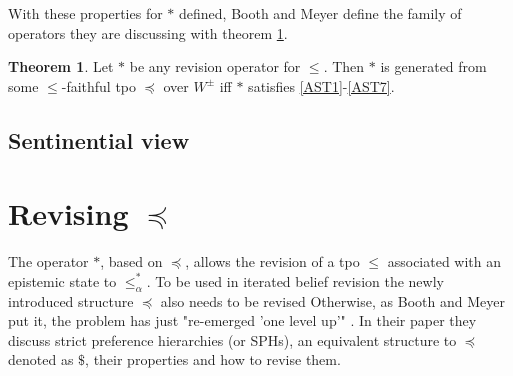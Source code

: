 \documentclass[english, 12pt]{scrartcl}
\theoremstyle{definition}
\theoremstyle{definition}
\theoremstyle{definition}
\newtheorem{theorem}{Theorem}
\begin{document}
\bigskip

With these properties for $\ast$ defined, Booth and Meyer define the family of operators they are discussing with theorem \ref{theorem:revision-operator}.


\begin{theorem}
\label{theorem:revision-operator}Let $\ast$ be any revision operator for $\leq$. Then $\ast$ is generated from some $\leq$-faithful tpo $\preceq$ over $W^{\pm}$ iff $\ast$ satisfies \ref{AST1}-\ref{AST7}. \cite{Booth2011}
\end{theorem}


\subsection{Sentinential view}

\section{Revising $\preceq$}

The operator $\ast$, based on $\preceq$, allows the revision of a tpo $\leq$ associated with an epistemic state to $\leq_{\alpha}^{\ast}$. To be used in iterated belief revision the newly introduced structure $\preceq$ also needs to be revised Otherwise, as Booth and Meyer put it, the problem has just "re-emerged 'one level up'" \cite{Booth2011}. In their paper they discuss strict preference hierarchies (or SPHs), an equivalent structure to $\preceq$ denoted as $\$$, their properties and how to revise them.
\end{document}
